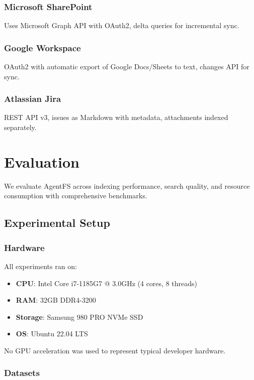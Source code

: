 \documentclass[conference]{IEEEtran}
\begin{document}
\subsubsection{Microsoft SharePoint}
Uses Microsoft Graph API with OAuth2, delta queries for incremental sync.

\subsubsection{Google Workspace}
OAuth2 with automatic export of Google Docs/Sheets to text, changes API for sync.

\subsubsection{Atlassian Jira}
REST API v3, issues as Markdown with metadata, attachments indexed separately.

\section{Evaluation}

We evaluate AgentFS across indexing performance, search quality, and resource consumption with comprehensive benchmarks.

\subsection{Experimental Setup}

\subsubsection{Hardware}
All experiments ran on:
\begin{itemize}
    \item \textbf{CPU}: Intel Core i7-1185G7 @ 3.0GHz (4 cores, 8 threads)
    \item \textbf{RAM}: 32GB DDR4-3200
    \item \textbf{Storage}: Samsung 980 PRO NVMe SSD
    \item \textbf{OS}: Ubuntu 22.04 LTS
\end{itemize}

No GPU acceleration was used to represent typical developer hardware.

\subsubsection{Datasets}
\end{document}
